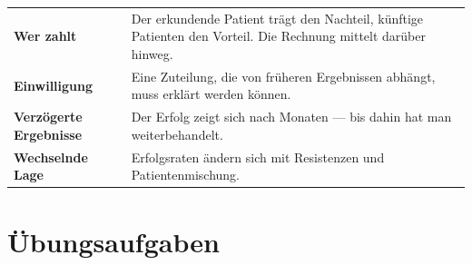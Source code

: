 \begin{warnung}
\begin{center}
{\small
\renewcommand{\arraystretch}{1.52}
\begin{tabular}{@{}P{2.6cm}P{6.0cm}@{}}
\toprule
\textbf{Wer zahlt} & Der erkundende Patient trägt den Nachteil, künftige Patienten den Vorteil. Die Rechnung mittelt darüber hinweg.\\
\textbf{Einwilligung} & Eine Zuteilung, die von früheren Ergebnissen abhängt, muss erklärt werden können.\\
\textbf{Verzögerte Ergebnisse} & Der Erfolg zeigt sich nach Monaten --- bis dahin hat man weiterbehandelt.\\
\textbf{Wechselnde Lage} & Erfolgsraten ändern sich mit Resistenzen und Patientenmischung.\\
\bottomrule
\end{tabular}}
\end{center}

\begin{center}
\begin{minipage}{0.88\textwidth}
\end{minipage}
\end{center}
\end{warnung}

\section{Übungsaufgaben}


